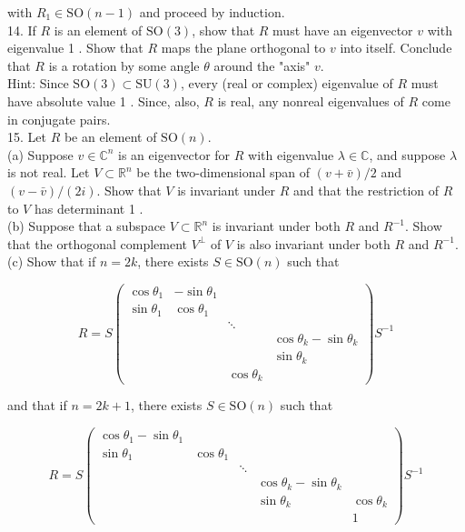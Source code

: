\documentclass[10pt, letterpaper]{article}
\begin{document}
with $R_{1} \in \mathrm{SO}(n-1)$ and proceed by induction.\\
14. If $R$ is an element of $\mathrm{SO}(3)$, show that $R$ must have an eigenvector $v$ with eigenvalue 1 . Show that $R$ maps the plane orthogonal to $v$ into itself. Conclude that $R$ is a rotation by some angle $\theta$ around the "axis" $v$.\\
Hint: Since $\mathrm{SO}(3) \subset \mathrm{SU}(3)$, every (real or complex) eigenvalue of $R$ must have absolute value 1 . Since, also, $R$ is real, any nonreal eigenvalues of $R$ come in conjugate pairs.\\
15. Let $R$ be an element of $\mathrm{SO}(n)$.\\
(a) Suppose $v \in \mathbb{C}^{n}$ is an eigenvector for $R$ with eigenvalue $\lambda \in \mathbb{C}$, and suppose $\lambda$ is not real. Let $V \subset \mathbb{R}^{n}$ be the two-dimensional span of $(v+\bar{v}) / 2$ and $(v-\bar{v}) /(2 i)$. Show that $V$ is invariant under $R$ and that the restriction of $R$ to $V$ has determinant 1 .\\
(b) Suppose that a subspace $V \subset \mathbb{R}^{n}$ is invariant under both $R$ and $R^{-1}$. Show that the orthogonal complement $V^{\perp}$ of $V$ is also invariant under both $R$ and $R^{-1}$.\\
(c) Show that if $n=2 k$, there exists $S \in \mathrm{SO}(n)$ such that

$$
R=S\left(\begin{array}{rrrr}
\cos \theta_{1} & -\sin \theta_{1} & & \\
\sin \theta_{1} & \cos \theta_{1} & & \\
& & \ddots & \\
& & & \cos \theta_{k}-\sin \theta_{k} \\
& & & \sin \theta_{k} \\
& & \cos \theta_{k}
\end{array}\right) S^{-1}
$$

and that if $n=2 k+1$, there exists $S \in \mathrm{SO}(n)$ such that

$$
R=S\left(\begin{array}{ccccc}
\cos \theta_{1}-\sin \theta_{1} & & & \\
\sin \theta_{1} & \cos \theta_{1} & & & \\
& & \ddots & & \\
& & & \cos \theta_{k}-\sin \theta_{k} & \\
& & & \sin \theta_{k} & \cos \theta_{k} \\
& & & & 1
\end{array}\right) S^{-1}
$$
\end{document}
